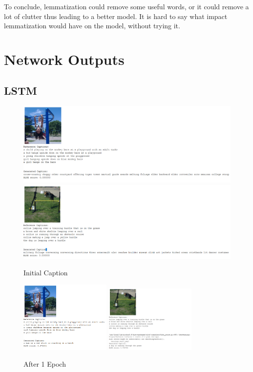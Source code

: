 \documentclass{article}
\begin{document}
    To conclude, lemmatization could remove some useful words, or it could remove a lot of clutter thus leading to a better model. It is hard to say what impact lemmatization would have on the model, without trying it.

    \section{Network Outputs}

    \subsection{LSTM}
    \begin{figure}[H]
        \centering
        \includegraphics[width=1\textwidth]{lstm_girl_epoch_0.PNG}
        \includegraphics[width=1\textwidth]{lstm_dog_epoch_0.PNG}
        \caption{Initial Caption}
    \end{figure}

    \begin{figure}[H]
        \centering
        \includegraphics[width=0.4\textwidth]{lstm_girl_epoch_1.PNG}
        \includegraphics[width=0.4\textwidth]{lstm_dog_epoch_1.PNG}
        \caption{After 1 Epoch}
    \end{figure}
\end{document}

